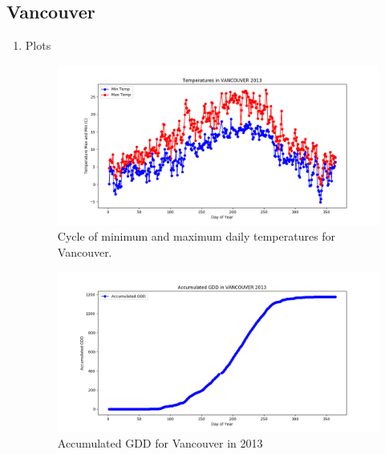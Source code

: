 \documentclass{article}
\begin{document}
\subsection{ \bf Vancouver }

\begin{enumerate}

\item  Plots 

\begin{center}
\begin{figure}[H]
\includegraphics[width=5.25in]{Plot/VANCOUVER/day_vs_temp_2013.png}




\caption{Cycle of minimum and maximum daily temperatures for Vancouver.}
\label{4}
\end{figure}
\end{center}

\begin{figure}[H]
\includegraphics[width=5.25in]{Plot/vancuver.png}



\caption{Accumulated GDD for Vancouver in 2013}
\label{4.4}
\end{figure}

\end{enumerate}
\end{document}
